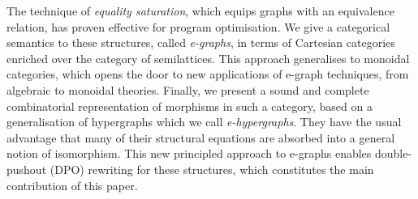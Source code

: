 The technique of \emph{equality saturation}, which equips graphs with an equivalence relation, has proven effective for program optimisation.
We give a categorical semantics to these structures, called \emph{e-graphs}, in terms of Cartesian categories enriched over the category of semilattices.
This approach generalises to monoidal categories, which opens the door to new applications of e-graph techniques, from algebraic to monoidal theories.
Finally, we present a sound and complete combinatorial representation of morphisms in such a category,  based on a generalisation of hypergraphs which we call \emph{e-hypergraphs}.
They have the usual advantage that many of their structural equations are absorbed into a general notion of isomorphism.
This new principled approach to e-graphs enables double-pushout (DPO) rewriting for these structures, which constitutes the main contribution of this paper.
